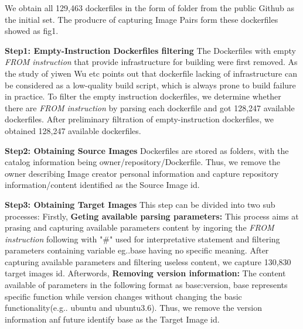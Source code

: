 \documentclass[sigconf]{acmart}
\begin{document}




We obtain all 129,463 dockerfiles in the form of folder from the public Github as the initial set. The producre of capturing Image Pairs form these dockerfiles showed as fig1.    %

\noindent\textbf{Step1: Empty-Instruction Dockerfiles filtering} The Dockerfiles with empty \emph{FROM instruction} that provide infrastructure for building were first removed. As the study of yiwen Wu etc points out that dockerfile lacking of infrastructure can be considered as a low-quality build script, which is always prone to build failure in practice. To filter the empty instruction dockerfiles, we determine whether there are  \emph{FROM instruction} by parsing each dockerfile and got 128,247 available dockerfiles. After preliminary filtration of empty-instruction dockerfiles, we obtained 128,247 available dockerfiles.      %

\noindent\textbf{Step2: Obtaining Source Images} Dockerfiles are stored as folders, with the catalog information being owner/repository/Dockerfile. Thus, we remove the owner describing Image creator personal information and capture repository information/content identified as the Source Image id.   


\noindent\textbf{Step3: Obtaining Target Images}  This step can be divided into two sub processes: Firstly, \noindent\textbf{Geting available parsing parameters:} This process aims at prasing and capturing available parameters content by ingoring the \emph{FROM instruction} following with "\#" used for interpretative statement and filtering parameters containing variable eg..{base} having no specific meaning. After capturing available parameters and filtering useless content, we capture 130,830 target images id.
Afterwords, \noindent\textbf{Removing version information:} The content available of parameters in the following format as  base:version, base represents specific function while version changes without changing the basic functionality(e.g.. ubuntu and ubuntu3.6). Thus, we remove the version information anf future identify base as the Target Image id. %
\end{document}
